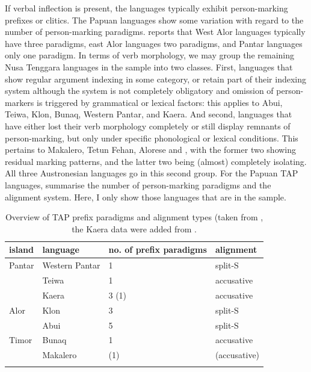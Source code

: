 If verbal inflection is present, the languages typically exhibit person-marking prefixes or clitics. The Papuan languages show some variation with regard to the number of person-marking paradigms. \citet{schapper2014intro} reports that West Alor languages typically have three paradigms, east Alor languages two paradigms, and Pantar languages only one paradigm. In terms of verb morphology, we may group the remaining Nusa Tenggara languages in the sample into two classes. First, languages that show regular argument indexing in some category, or retain part of their indexing system although the system is not completely obligatory and omission of person-markers is triggered by grammatical or lexical factors: this applies to Abui, Teiwa, Klon, Bunaq, Western Pantar, and Kaera. And second, languages that have either lost their verb morphology completely or still display remnants of person-marking, but only under specific phonological or lexical conditions. This pertains to Makalero, Tetun Fehan, Alorese and , with the former two showing residual marking patterns, and the latter two being (almost) completely isolating. All three Austronesian languages go in this second group. For the Papuan TAP languages, \textcite{klamer2012development} summarise the number of person-marking paradigms and the alignment system. Here, I only show those languages that are in the sample.

\begin{table}
\begin{tabular}{l l l l}
\lsptoprule
island & language & no. of prefix paradigms & alignment \tabularnewline
\midrule
Pantar & Western Pantar & 1 & split-S \tabularnewline
 & Teiwa & 1 & accusative \tabularnewline
 & Kaera & 3 (1) & accusative \tabularnewline
 Alor & Klon & 3 & split-S \tabularnewline
 & Abui & 5 & split-S \tabularnewline
 Timor & Bunaq & 1 & accusative \tabularnewline
 & Makalero & (1) & (accusative) \tabularnewline
\lspbottomrule
\end{tabular}
\caption[Overview of TAP prefix paradigms and alignment types]{Overview of TAP prefix paradigms and alignment types (taken from \citealt[178]{klamer2012development}, the Kaera data were added from \citealt[128]{klamer2014kaera}.}
\label{table:TAPprefixalign}
\end{table}

